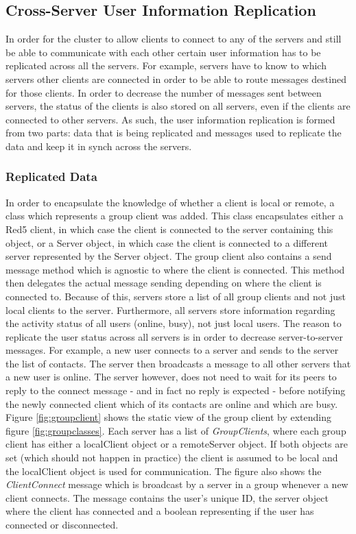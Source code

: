 \subsection{Cross-Server User Information Replication}

In order for the cluster to allow clients to connect to any of the servers and still be able to communicate with each other certain user information has to be replicated across all the servers. For example, servers have to know to which servers other clients are connected in order to be able to route messages destined for those clients. In order to decrease the number of messages sent between servers, the status of the clients is also stored on all servers, even if the clients are connected to other servers. As such, the user information replication is formed from two parts: data that is being replicated and messages used to replicate the data and keep it in synch across the servers.

\subsubsection*{Replicated Data}

In order to encapsulate the knowledge of whether a client is local or remote, a class which represents a group client was added. This class encapsulates either a Red5 client, in which case the client is connected to the server containing this object, or a Server object, in which case the client is connected to a different server represented by the Server object. The group client also contains a send message method which is agnostic to where the client is connected. This method then delegates the actual message sending depending on where the client is connected to. Because of this, servers store a list of all group clients and not just local clients to the server. Furthermore, all servers store information regarding the activity status of all users (online, busy), not just local users. The reason to replicate the user status across all servers is in order to decrease server-to-server messages. For example, a new user connects to a server and sends to the server the list of contacts. The server then broadcasts a message to all other servers that a new user is online. The server however, does not need to wait for its peers to reply to the connect message - and in fact no reply is expected - before notifying the newly connected client which of its contacts are online and which are busy. Figure \ref{fig:groupclient} shows the static view of the group client by extending figure \ref{fig:groupclasses}. Each server has a list of \textit{GroupClients}, where each group client has either a localClient object or a remoteServer object. If both objects are set (which should not happen in practice) the client is assumed to be local and the localClient object is used for communication. The figure also shows the \textit{ClientConnect} message which is broadcast by a server in a group whenever a new client connects. The message contains the user's unique ID, the server object where the client has connected and a boolean representing if the user has connected or disconnected.

